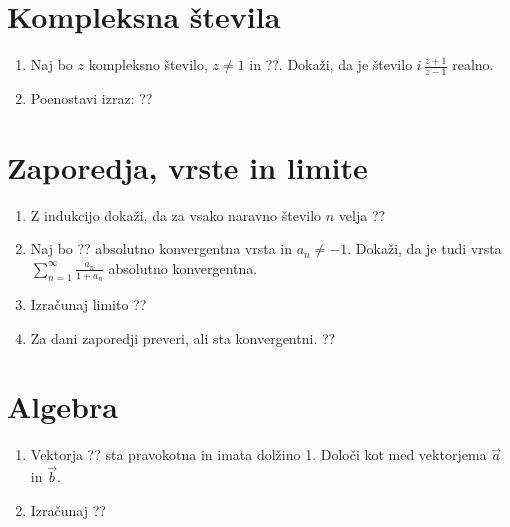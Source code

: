 \documentclass[a4paper,12pt]{article}
\begin{document}
\section*{Kompleksna števila}

\begin{enumerate}
\item
Naj bo \(z\) kompleksno število, \(z \ne 1\) in ??.
Dokaži, da je število \( i \, \frac{z+1}{z-1} \) realno.

\item
Poenostavi izraz:
??
\end{enumerate}

\section*{Zaporedja, vrste in limite}

\begin{enumerate}
\item
Z indukcijo dokaži, da za vsako naravno število \(n\) velja
??

\item
Naj bo ?? absolutno konvergentna vrsta in \(a_n \ne -1\).
Dokaži, da je tudi vrsta \(\sum_{n=1}^\infty \frac{a_n}{1+a_n}\)
absolutno konvergentna.

\item
Izračunaj limito
??

\item
Za dani zaporedji preveri, ali sta konvergentni.
??
\end{enumerate}

\section*{Algebra}

\begin{enumerate}
\item
Vektorja ??
sta pravokotna in imata dolžino 1. Določi kot med vektorjema \(\vec{a}\) in \(\vec{b}\).

\item
Izračunaj
??
\end{enumerate}
\end{document}
